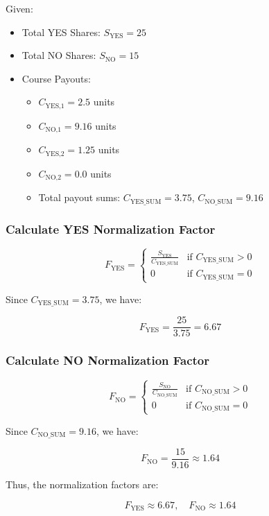 \documentclass{article}
\begin{document}
Given:
\begin{itemize}
    \item Total YES Shares: \( S_{\text{YES}} = 25 \)
    \item Total NO Shares: \( S_{\text{NO}} = 15 \)
    \item Course Payouts:
    \begin{itemize}
        \item \( C_{\text{YES,1}} = 2.5 \) units
        \item \( C_{\text{NO,1}} = 9.16 \) units
        \item \( C_{\text{YES,2}} = 1.25 \) units
        \item \( C_{\text{NO,2}} = 0.0 \) units
        \item Total payout sums: \( C_{\text{YES\_SUM}} = 3.75 \), \( C_{\text{NO\_SUM}} = 9.16 \)
    \end{itemize}
\end{itemize}

\subsubsection*{Calculate YES Normalization Factor}

\[
F_{\text{YES}} =
\begin{cases}
      \frac{S_{\text{YES}}}{C_{\text{YES\_SUM}}} & \text{if } C_{\text{YES\_SUM}} > 0 \\
      0 & \text{if } C_{\text{YES\_SUM}} = 0
   \end{cases}
\]

Since \( C_{\text{YES\_SUM}} = 3.75 \), we have:

\[
F_{\text{YES}} = \frac{25}{3.75} = 6.67
\]

\subsubsection*{Calculate NO Normalization Factor}

\[
F_{\text{NO}} =
\begin{cases}
      \frac{S_{\text{NO}}}{C_{\text{NO\_SUM}}} & \text{if } C_{\text{NO\_SUM}} > 0 \\
      0 & \text{if } C_{\text{NO\_SUM}} = 0
   \end{cases}
\]

Since \( C_{\text{NO\_SUM}} = 9.16 \), we have:

\[
F_{\text{NO}} = \frac{15}{9.16} \approx 1.64
\]

Thus, the normalization factors are:

\[
F_{\text{YES}} \approx 6.67, \quad F_{\text{NO}} \approx 1.64
\]


\begin{center}
\end{center}
\end{document}
